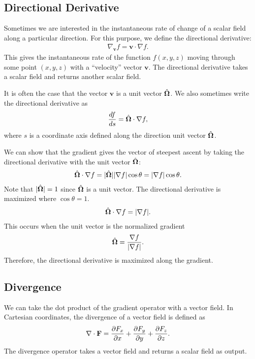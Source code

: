 \subsection{Directional Derivative}

Sometimes we are interested in the instantaneous rate of change of a scalar field along a particular direction. For this purpose, we define the directional derivative:
\begin{align}
  \nabla_\mathbf{v} f = \mathbf{v} \cdot \nabla f.
\end{align}
This gives the instantaneous rate of the function $f(x,y,z)$ moving through some point $(x,y,z)$ with a ``velocity'' vector $\mathbf{v}$. The directional derivative takes a scalar field and returns another scalar field.

It is often the case that the vector $\mathbf{v}$ is a unit vector $\hat{\mathbf{\Omega}}$. We also sometimes write the directional derivative as
\begin{align}
  \frac{df}{ds} = \hat{\mathbf{\Omega}} \cdot \nabla f,
\end{align}
where $s$ is a coordinate axis defined along the direction unit vector $\hat{\mathbf{\Omega}}$.

We can show that the gradient gives the vector of steepest ascent by taking the directional derivative with the unit vector $\hat{\mathbf{\Omega}}$:
\begin{align}
  \hat{\mathbf{\Omega}} \cdot \nabla f = | \hat{\mathbf{\Omega}} | | \nabla f | \cos \theta = | \nabla f | \cos \theta .
\end{align}
Note that $| \hat{\mathbf{\Omega}} | = 1$ since $\hat{\mathbf{\Omega}}$ is a unit vector. The directional derivative is maximized where $\cos \theta = 1$.
\begin{align}
  \hat{\mathbf{\Omega}} \cdot \nabla f = | \nabla f | . \nonumber
\end{align}
This occurs when the unit vector is the normalized gradient
\begin{align}
  \hat{\mathbf{\Omega}} = \frac{ \nabla f }{ | \nabla f | } .
\end{align}
Therefore, the directional derivative is maximized along the gradient.

\subsection{Divergence}

We can take the dot product of the gradient operator with a vector field. In Cartesian coordinates, the divergence of a vector field is defined as
\begin{align}
  \nabla \cdot \mathbf{F} = \frac{ \partial {F_x} }{ \partial {x} } + \frac{ \partial {F_y} }{ \partial {y} } + \frac{ \partial {F_z} }{ \partial {z} }.
\end{align}
The divergence operator takes a vector field and returns a scalar field as output.

